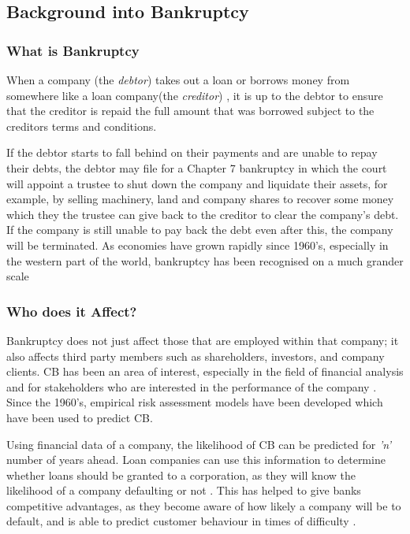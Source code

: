 \documentclass[11pt]{article}
\begin{document}
\subsection{Background into Bankruptcy}%
\subsubsection{What is Bankruptcy}\label{sec:bankdef}
When a company (the \textit{debtor}) takes out a loan or borrows money from somewhere like a loan company(the \textit{creditor}) , it is up to the debtor to ensure that the creditor is repaid the full amount that was borrowed subject to the creditors terms and conditions.


If the debtor starts to fall behind on their payments and are unable to repay their debts, the debtor may file for a Chapter 7 bankruptcy in which the court will appoint a trustee to shut down the company and liquidate their assets, for example, by selling machinery, land and company shares to recover some money which they the trustee can give back to the creditor to clear the company's debt. If the company is still unable to pay back the debt even after this, the company will be terminated. As economies have grown rapidly since 1960's, especially in the western part of the world, bankruptcy has been recognised on a much grander scale \cite{?}
\subsubsection{Who does it Affect?}
Bankruptcy does not just affect those that are employed within that company; it also affects third party members such as shareholders, investors, and company clients. CB has been an area of interest, especially in the field of financial analysis and for stakeholders who are interested in the performance of the company \cite{?}. Since the 1960's, empirical risk assessment models have been developed which have been used to predict CB. 

Using financial data of a company, the likelihood of CB can be predicted for \textit{'n'} number of years ahead. 
Loan companies can use this information to determine whether loans should be granted to a corporation, as they will know the likelihood of a company defaulting or not \cite{?}. This has helped to give banks competitive advantages, as they become aware of how likely a company will be to default, and is able to predict customer behaviour in times of difficulty \cite{?}.
\end{document}
